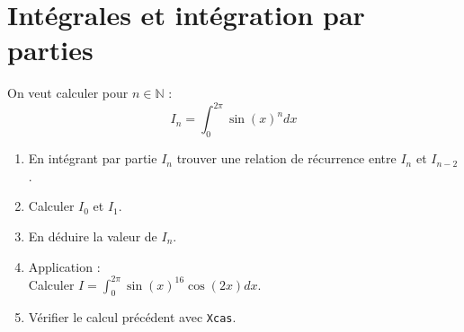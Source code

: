 \documentclass[a4paper,11pt]{book}
\newcommand{\N}{{\mathbb{N}}}
\begin{document}
\section{Int\'egrales et int\'egration par parties}
On veut calculer pour $n \in \N$ :
$$I_n=\int_0^{2\pi}\sin(x)^ndx$$
\begin{enumerate}
\item En int\'egrant par partie $I_n$ trouver une relation de r\'ecurrence 
entre $I_n$  et $I_{n-2}$.
\item Calculer $I_0$ et $I_1$.
\item En d\'eduire la valeur de $I_n$.
\item Application :\\
Calculer $I=\int_0^{2\pi}\sin(x)^{16}\cos(2x)dx$.
\item V\'erifier le calcul pr\'ec\'edent avec {\tt Xcas}.
\end{enumerate}
\end{document}
